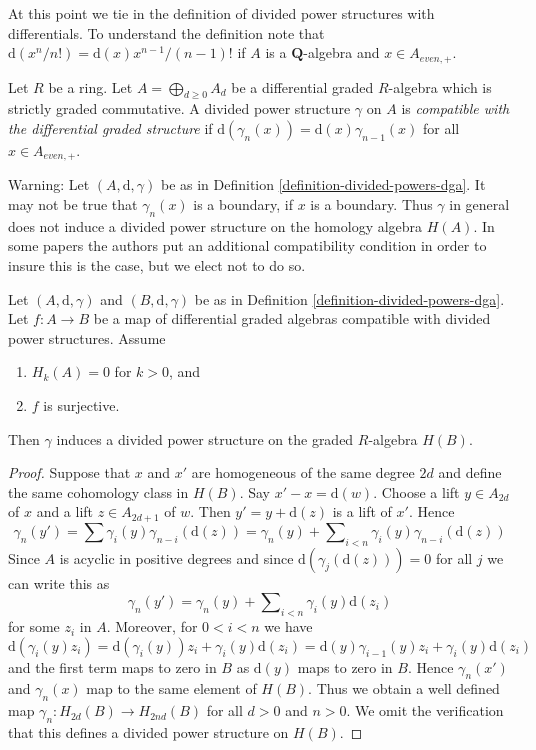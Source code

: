 \noindent
At this point we tie in the definition of divided power structures
with differentials. To understand the definition note that
$\text{d}(x^n/n!) = \text{d}(x) x^{n - 1}/(n - 1)!$ if $A$
is a $\mathbf{Q}$-algebra and $x \in A_{even, +}$.

\begin{definition}
\label{definition-divided-powers-dga}
Let $R$ be a ring. Let $A = \bigoplus_{d \geq 0} A_d$ be a
differential graded $R$-algebra which is strictly graded commutative.
A divided power structure $\gamma$ on $A$ is {\it compatible with
the differential graded structure} if
$\text{d}(\gamma_n(x)) = \text{d}(x) \gamma_{n - 1}(x)$ for
all $x \in A_{even, +}$.
\end{definition}

\noindent
Warning: Let $(A, \text{d}, \gamma)$ be as in
Definition \ref{definition-divided-powers-dga}.
It may not be true that $\gamma_n(x)$ is a boundary, if
$x$ is a boundary. Thus $\gamma$ in general does not induce
a divided power structure on the homology algebra $H(A)$.
In some papers the authors put an additional compatibility
condition in order to insure this is the case, but we elect
not to do so.

\begin{lemma}
\label{lemma-dpdga-good}
Let $(A, \text{d}, \gamma)$ and $(B, \text{d}, \gamma)$ be as in
Definition \ref{definition-divided-powers-dga}. Let $f : A \to B$
be a map of differential graded algebras compatible with divided
power structures. Assume
\begin{enumerate}
\item $H_k(A) = 0$ for $k > 0$, and
\item $f$ is surjective.
\end{enumerate}
Then $\gamma$ induces a divided power structure on the graded
$R$-algebra $H(B)$.
\end{lemma}

\begin{proof}
Suppose that $x$ and $x'$ are homogeneous of the same degree $2d$
and define the same cohomology class in $H(B)$. Say $x' - x = \text{d}(w)$.
Choose a lift $y \in A_{2d}$ of $x$ and a lift $z \in A_{2d + 1}$
of $w$. Then $y' = y + \text{d}(z)$ is a lift of $x'$.
Hence
$$
\gamma_n(y') = \sum \gamma_i(y) \gamma_{n - i}(\text{d}(z))
= \gamma_n(y) +
\sum\nolimits_{i < n} \gamma_i(y) \gamma_{n - i}(\text{d}(z))
$$
Since $A$ is acyclic in positive degrees and since
$\text{d}(\gamma_j(\text{d}(z))) = 0$ for all $j$ we can write
this as
$$
\gamma_n(y') = \gamma_n(y) +
\sum\nolimits_{i < n} \gamma_i(y) \text{d}(z_i)
$$
for some $z_i$ in $A$. Moreover, for $0 < i < n$ we have
$$
\text{d}(\gamma_i(y) z_i) =
\text{d}(\gamma_i(y))z_i + \gamma_i(y)\text{d}(z_i) =
\text{d}(y) \gamma_{i - 1}(y) z_i + \gamma_i(y)\text{d}(z_i)
$$
and the first term maps to zero in $B$ as $\text{d}(y)$ maps to zero in $B$.
Hence $\gamma_n(x')$ and $\gamma_n(x)$ map to the same element of $H(B)$.
Thus we obtain a well defined map $\gamma_n : H_{2d}(B) \to H_{2nd}(B)$
for all $d > 0$ and $n > 0$. We omit the verification that this
defines a divided power structure on $H(B)$.
\end{proof}


